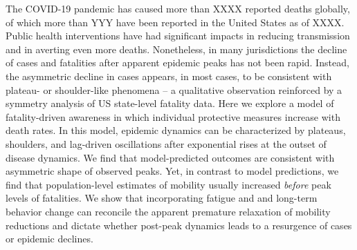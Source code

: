 The COVID-19 pandemic has caused more than XXXX reported deaths
globally, of which more than YYY have been reported
in the United States as of XXXX. Public health interventions
have had significant impacts in reducing transmission and in
averting even more deaths. Nonetheless, in many jurisdictions
the decline of cases and fatalities
after apparent epidemic peaks has not been rapid.  Instead, the asymmetric
decline in cases appears, in most cases, to be consistent
with plateau- or shoulder-like phenomena -- a qualitative
observation reinforced by a symmetry analysis
of US state-level fatality data.  Here we explore a model of fatality-driven
awareness in which individual protective measures increase
with death rates.  In this model, epidemic dynamics
can be characterized by plateaus, shoulders,
and lag-driven oscillations after exponential rises
at the outset of disease dynamics. 
We find that model-predicted outcomes
are consistent with asymmetric shape of observed peaks. 
Yet, in contrast
to model predictions, we find that population-level
estimates of mobility usually increased \emph{before} 
peak levels of fatalities.  We show that
incorporating fatigue and
and long-term behavior change can reconcile the apparent
premature relaxation of mobility reductions and dictate whether
post-peak dynamics leads to a resurgence of cases or epidemic declines.
